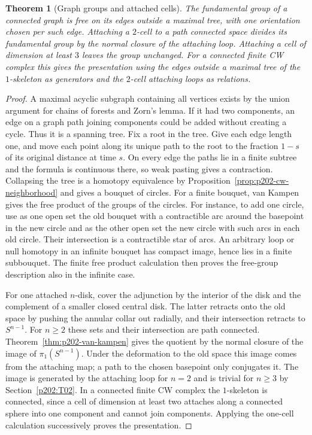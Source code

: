 \documentclass[11pt,oneside,openany]{book}
\theoremstyle{plain}
\newtheorem{theorem}{Theorem}[chapter]
\theoremstyle{definition}
\theoremstyle{remark}
\begin{document}
\begin{theorem}[Graph groups and attached cells]
\label{thm:p202-graph-attach}
The fundamental group of a connected graph is free on its
edges outside a maximal tree, with one orientation chosen
per such edge. Attaching a \(2\)-cell to a path connected
space divides its fundamental group by the normal closure
of the attaching loop. Attaching a cell of dimension
at least \(3\) leaves the group unchanged. For a connected
finite CW complex this gives the presentation using the
edges outside a maximal tree of the \(1\)-skeleton as
generators and the \(2\)-cell attaching loops as relations.
\end{theorem}

\begin{proof}
A maximal acyclic subgraph containing all vertices exists
by the union argument for chains of forests and Zorn's
lemma. If it had two components, an edge on a graph path
joining components could be added without creating a cycle.
Thus it is a spanning tree. Fix a root in the tree. Give
each edge length one, and move each point along its unique
path to the root to the fraction \(1-s\) of its original
distance at time \(s\). On every edge the paths lie in
a finite subtree and the formula is continuous there, so
weak pasting gives a contraction. Collapsing the tree is a
homotopy equivalence by Proposition~\ref{prop:p202-cw-neighborhood}
and gives a bouquet of circles. For a finite bouquet,
van Kampen gives the free product of the groups of the
circles. For instance, to add one circle, use as one open
set the old bouquet with a contractible arc around the
basepoint in the new circle and as the other open set the
new circle with such arcs in each old circle. Their
intersection is a contractible star of arcs. An arbitrary
loop or null homotopy in an infinite bouquet has compact
image, hence lies in a finite subbouquet. The finite free
product calculation then proves the free-group description
also in the infinite case.

For one attached \(n\)-disk, cover the adjunction by the
interior of the disk and the complement of a smaller
closed central disk. The latter retracts onto the old
space by pushing the annular collar out radially, and
their intersection retracts to \(S^{n-1}\). For \(n\ge2\)
these sets and their intersection are path connected.
Theorem~\ref{thm:p202-van-kampen} gives the quotient by the
normal closure of the image of \(\pi_1(S^{n-1})\). Under
the deformation to the old space this image comes from the
attaching map; a path to the chosen basepoint only
conjugates it. The image is generated by the attaching
loop for \(n=2\) and is trivial for \(n\ge3\) by
Section~\ref{p202:T02}. In a connected finite CW complex
the \(1\)-skeleton is connected, since a cell of dimension
at least two attaches along a connected sphere into one
component and cannot join components. Applying the
one-cell calculation successively proves the presentation.
\end{proof}
\end{document}

